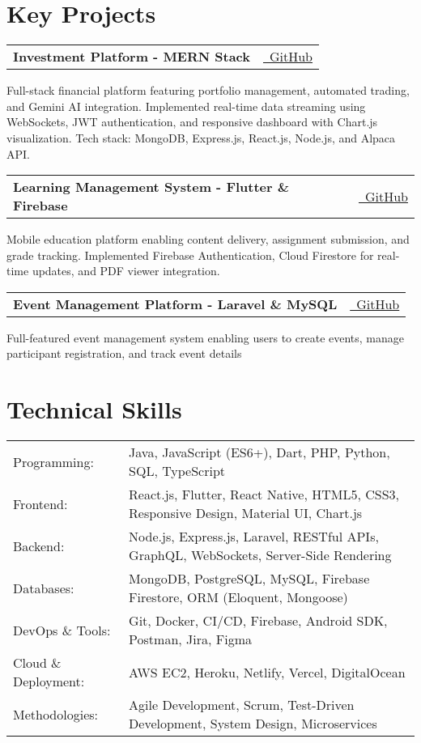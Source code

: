 \documentclass[10pt,a4paper]{article}
\makeatletter
\newcommand{\resumeProject}[3]{
  \vspace{-1pt}
  \begin{tabular*}{\textwidth}[t]{l@{\extracolsep{\fill}}r}
    \textbf{#1} & #2 \\
  \end{tabular*}
  \noindent
  \small{#3}
  \vspace{0.3em}
}
\makeatother
\begin{document}
\vspace{0.1em}

\section{Key Projects}

\resumeProject
{Investment Platform - MERN Stack}
{\href{https://github.com/richiebthomas/FinalSubmissionCodeCrafter}{\faGithub\ GitHub}}
{Full-stack financial platform featuring portfolio management, automated trading, and Gemini AI integration. Implemented real-time data streaming using WebSockets, JWT authentication, and responsive dashboard with Chart.js visualization. Tech stack: MongoDB, Express.js, React.js, Node.js, and Alpaca API.}

\resumeProject
{Learning Management System - Flutter \& Firebase}
{\href{https://github.com/richiebthomas/flutter_LMS_app}{\faGithub\ GitHub}}
{Mobile education platform enabling content delivery, assignment submission, and grade tracking. Implemented Firebase Authentication, Cloud Firestore for real-time updates, and PDF viewer integration.}

\resumeProject
{Event Management Platform - Laravel \& MySQL}
{\href{https://github.com/richiebthomas/yetamax}{\faGithub\ GitHub}}
{Full-featured event management system enabling users to create events, manage participant registration, and track event details}

\vspace{0.1em}

\section{Technical Skills}
\begin{tabular*}{\textwidth}{@{}p{}@{\hspace{0.02\textwidth}}p{}@{}}
Programming: & Java, JavaScript (ES6+), Dart, PHP, Python, SQL, TypeScript \\[2pt]
Frontend: & React.js, Flutter, React Native, HTML5, CSS3, Responsive Design, Material UI, Chart.js \\[2pt]
Backend: & Node.js, Express.js, Laravel, RESTful APIs, GraphQL, WebSockets, Server-Side Rendering \\[2pt]
Databases: & MongoDB, PostgreSQL, MySQL, Firebase Firestore, ORM (Eloquent, Mongoose) \\[2pt]
DevOps \& Tools: & Git, Docker, CI/CD, Firebase, Android SDK, Postman, Jira, Figma \\[2pt]
Cloud \& Deployment: & AWS EC2, Heroku, Netlify, Vercel, DigitalOcean \\[2pt]
Methodologies: & Agile Development, Scrum, Test-Driven Development, System Design, Microservices \\
\end{tabular*}
\end{document}
